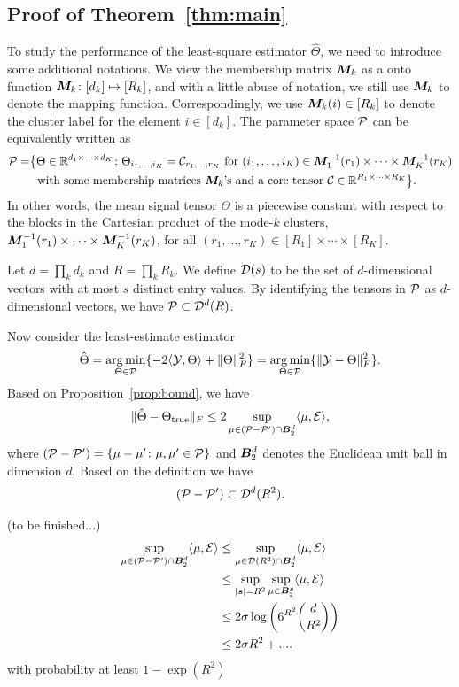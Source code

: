 \documentclass{article}
\begin{document}
\begin{appendices}
\subsection{Proof of Theorem~\ref{thm:main}}
To study the performance of the least-square estimator $\hat \Theta$, we need to introduce some additional notations. We view the membership matrix $\bm M_k$ as a onto function $\bm M_k\colon [d_k]\mapsto [R_k]$, and with a little abuse of notation, we still use $\bm M_k$ to denote the mapping function. Correspondingly, we use $\bm M_k(i)\in[R_k]$ to denote the cluster label for the element $i\in[d_k]$.  The parameter space $\mathcal{P}$ can be equivalently written as
\begin{align}
\mathcal{P}=&\big\{ \Theta\in\mathbb{R}^{d_1\times \cdots\times d_K}\colon \Theta_{i_1,\ldots,i_K}=\mathcal{C}_{r_1,\ldots,r_K} \text{ for } (i_1,\ldots,i_K)\in\bm M^{-1}_1(r_1)\times \cdots \times \bm M_K^{-1}(r_K)\notag \\
&\ \text{ with some membership matrices $\bm M_k$'s and a core tensor $\mathcal{C}\in\mathbb{R}^{R_1\times \cdots \times R_K}$} \big\}.\notag
\end{align}
In other words, the mean signal tensor $\Theta$ is a piecewise constant with respect to the blocks in the Cartesian product of the mode-$k$ clusters, $ \bm M^{-1}_1(r_1)\times \cdots \times \bm M_K^{-1}(r_K)$, for all $(r_1,\ldots,r_K)\in[R_1]\times \cdots\times [R_K]$. 

Let $d=\prod_k d_k$ and $R=\prod_k R_k$. We define $\mathcal{D}(s)$ to be the set of $d$-dimensional vectors with at most $s$ distinct entry values. 
By identifying the tensors in $\mathcal{P}$ as $d$-dimensional vectors, we have $\mathcal{P}\subset \mathcal{D}^d(R)$.


Now consider the least-estimate estimator
\[
\hat \Theta=\operatorname*{arg\,min}_{\Theta\in\mathcal{P}}\{-2\langle \mathcal{Y}, \Theta\rangle+\lVert\Theta\rVert_F^2 \}=\operatorname*{arg\,min}_{\Theta\in\mathcal{P}}\{\lVert\mathcal{Y}-\Theta\rVert_F^2 \}.
\]
Based on Proposition~\ref{prop:bound}, we have
\[
\lVert\hat \Theta-\Theta_{\text{true}}\rVert_F \leq 2\sup_{\mu\in (\mathcal{P}-\mathcal{P}') \cap \bm B^d_2}\langle \mu ,\mathcal{E}\rangle,
\]
where $(\mathcal{P}-\mathcal{P}')=\{\mu-\mu'\colon \mu, \mu'\in\mathcal{P}\}$ and $\bm B^{d}_2$ denotes the Euclidean unit ball in dimension $d$. Based on the definition we have
\[
(\mathcal{P}-\mathcal{P}')\subset \mathcal{D}^d(R^2).
\]

(to be finished...)
\begin{align}
\sup_{\mu\in (\mathcal{P}-\mathcal{P}')\cap \bm B^d_2}\langle \mu ,\mathcal{E}\rangle&\leq \sup_{\mu\in \mathcal{D}(R^2)\cap\bm B^d_2}\langle \mu, \mathcal{E}\rangle\\
&\leq \sup_{|\bm{s}|= R^2}\sup_{\mu\in\bm B_2^{\bm{s}}}\langle \mu, \mathcal{E}\rangle\\
&\leq2\sigma \log\left(6^{R^2}{d \choose R^2}\right)\\
&\leq 2\sigma R^2+....
\end{align}
with probability at least $1-\exp(R^2)$


\end{appendices}
\end{document}
